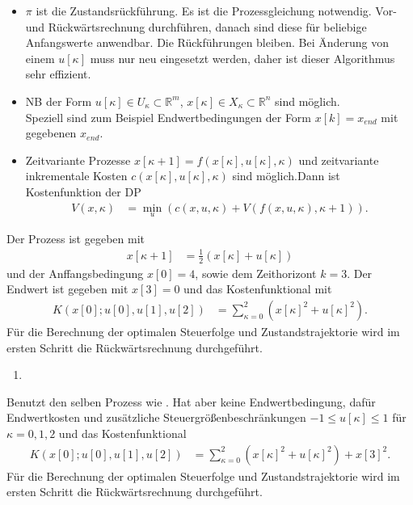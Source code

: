\begin{remark}\hspace{1mm}
\begin{itemize}
  \item $\pi$ ist die Zustandsrückführung. Es ist die Prozessgleichung notwendig. Vor- und Rückwärtsrechnung durchführen, danach sind diese für beliebige Anfangswerte
  anwendbar. Die Rückführungen bleiben. Bei Änderung von einem $u[\kappa]$ muss nur neu eingesetzt werden, daher ist dieser Algorithmus sehr effizient.
  \item \ac{NB} der Form $u[\kappa]\in U_{\kappa}\subset\mathbb{R}^m$, $x[\kappa]\in X_{\kappa}\subset\mathbb{R}^n$ sind möglich.\\
  Speziell sind zum Beispiel Endwertbedingungen der Form $x[k]=x_{end}$ mit gegebenen $x_{end}$.
  \item Zeitvariante Prozesse $x[\kappa+1]=f(x[\kappa],u[\kappa],\kappa)$ und zeitvariante inkrementale Kosten $c(x[\kappa],u[\kappa],\kappa)$ sind möglich.Dann ist Kostenfunktion der
  \ac{DP}
  \begin{align*}
  	V(x,\kappa) & = \min\limits_u\left(c(x,u,\kappa)+V\left(f(x,u,\kappa), \kappa +1 \right) \right).
  \end{align*}
\end{itemize}
\end{remark}
\begin{exmp}\label{exmp:kap_3_zeitdis_opt_1}
Der Prozess ist gegeben mit
\begin{align*}
	x[\kappa + 1] & = \frac12\left(x[\kappa]+u[\kappa] \right)
\end{align*}
und der Anffangsbedingung $x[0]=4$, sowie dem Zeithorizont $k=3$. Der Endwert ist gegeben mit $x[3]=0$ und das Kostenfunktional mit
\begin{align}
	K\left(x[0];u[0],u[1],u[2] \right) & = \sum\limits_{\kappa=0}^2\left(x[\kappa]^2+u[\kappa]^2 \right).
\end{align}
Für die Berechnung der optimalen Steuerfolge und Zustandstrajektorie wird im ersten Schritt die Rückwärtsrechnung durchgeführt.
\begin{enumerate}
  \item 
\end{enumerate}
\end{exmp}
\begin{exmp}
Benutzt den selben Prozess wie . Hat aber keine Endwertbedingung, dafür Endwertkosten und zusätzliche
Steuergrößenbeschränkungen $-1\leq u[\kappa]\leq 1$ für $\kappa=0,1,2$ und das Kostenfunktional
\begin{align*}
	K\left(x[0];u[0],u[1],u[2]\right) & = \sum\limits_{\kappa=0}^2\left(x[\kappa]^2+u[\kappa]^2 \right) + x[3]^2.
\end{align*}
Für die Berechnung der optimalen Steuerfolge und Zustandstrajektorie wird im ersten Schritt die Rückwärtsrechnung durchgeführt.
\end{exmp}

